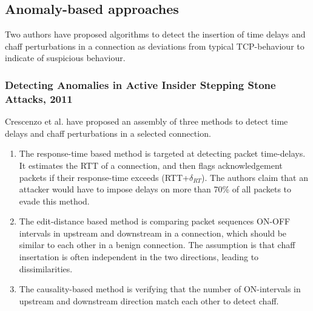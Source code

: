 \documentclass[runningheads]{llncs}\usepackage[]{graphicx}\usepackage[]{color}
\begin{document}


\subsection{Anomaly-based approaches}

Two authors have proposed algorithms to detect the insertion of time delays and chaff perturbations in a connection as deviations from typical TCP-behaviour to indicate of suspicious behaviour. 

\subsubsection{Detecting Anomalies in Active Insider Stepping Stone Attacks, 2011}

Crescenzo et al. \cite{di2011detecting} have proposed an assembly of three methods to detect time delays and chaff perturbations in a selected connection. 
\begin{enumerate}
\item The response-time based method is targeted at detecting packet time-delays. It estimates the RTT of a connection, and then flags acknowledgement packets if their response-time exceeds (RTT+$\delta_{RT}$). The authors claim that an attacker would have to impose delays on more than 70\% of all packets to evade this method.
\item The edit-distance based method is comparing packet sequences ON-OFF intervals in upstream and downstream in a connection, which should be similar to each other in a benign connection. The assumption is that chaff insertation is often independent in the two directions, leading to dissimilarities. 
\item The causality-based method is verifying that the number of ON-intervals in upstream and downstream direction match each other to detect chaff.
\end{enumerate}
\end{document}
